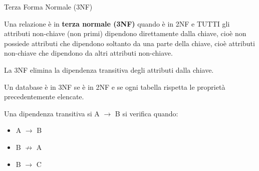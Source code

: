 %
\begin{frame}{Terza Forma Normale (3NF)}
\vspace{-1.5cm}
\begin{minipage}{0.9\textwidth}
Una relazione \`e in \textbf{terza normale (3NF)} quando \`e in 2NF e TUTTI gli attributi non-chiave (non primi) dipendono direttamente dalla chiave, cio\`e non possiede attributi che dipendono soltanto da una parte della chiave, cio\`e attributi non-chiave che dipendono da altri attributi non-chiave.
\end{minipage}
\pause

\vspace{.2cm}
La 3NF elimina la dipendenza transitiva degli attributi dalla chiave.

\begin{minipage}{0.7\textwidth}
\vspace{.2cm}
Un database \`e in 3NF se \`e in 2NF e se ogni tabella rispetta le propriet\`a precedentemente elencate.

Una dipendenza transitiva si A $ \rightarrow $ B si verifica quando:
\begin{itemize}
    \item A $ \rightarrow $ B
    \item B $ \not\to $ A
    \item B $ \rightarrow $ C
\end{itemize}
\end{minipage}
\end{frame}
%
